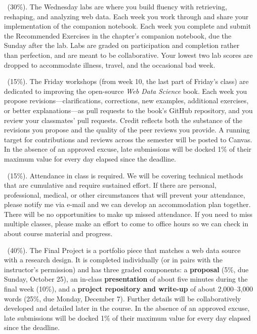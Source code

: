 \documentclass[11pt]{memoir}
\begin{document}
    \begin{description}[itemsep=0pt,labelsep=0pt,leftmargin=1em]

        \item[Notebook Labs]~(30\%). The Wednesday labs are where you build fluency with retrieving, reshaping, and analyzing web data. Each week you work through and share your implementation of the companion notebook. Each week you complete and submit the Recommended Exercises in the chapter's companion notebook, due the Sunday after the lab. Labs are graded on participation and completion rather than perfection, and are meant to be collaborative. Your lowest two lab scores are dropped to accommodate illness, travel, and the occasional bad week.

        \item[Textbook Revisions]~(15\%). The Friday workshops (from week 10, the last part of Friday's class) are dedicated to improving the open-source \textit{Web Data Science} book. Each week you propose revisions---clarifications, corrections, new examples, additional exercises, or better explanations---as pull requests to the book's GitHub repository, and you review your classmates' pull requests. Credit reflects both the substance of the revisions you propose and the quality of the peer reviews you provide. A running target for contributions and reviews across the semester will be posted to Canvas. In the absence of an approved excuse, late submissions will be docked 1\% of their maximum value for every day elapsed since the deadline.

        \item[Attendance]~(15\%). Attendance in class is required. We will be covering technical methods that are cumulative and require sustained effort. If there are personal, professional, medical, or other circumstances that will prevent your attendance, please notify me via e-mail and we can develop an accommodation plan together. There will be no opportunities to make up missed attendance. If you need to miss multiple classes, please make an effort to come to office hours so we can check in about course material and progress.

        \item[Final Project]~(40\%). The Final Project is a portfolio piece that matches a web data source with a research design. It is completed individually (or in pairs with the instructor's permission) and has three graded components: a \textbf{proposal} (5\%, due Sunday, October 25), an in-class \textbf{presentation} of about five minutes during the final week (10\%), and a \textbf{project repository and write-up} of about 2,000--3,000 words (25\%, due Monday, December 7). Further details will be collaboratively developed and detailed later in the course. In the absence of an approved excuse, late submissions will be docked 1\% of their maximum value for every day elapsed since the deadline.

    \end{description}
\end{document}
